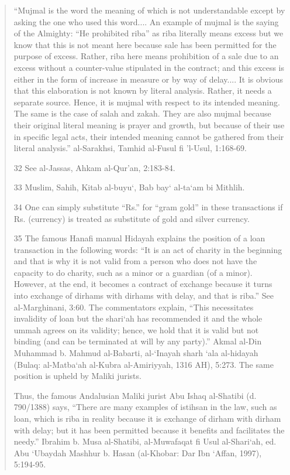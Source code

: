\begin{quote}
“Mujmal is the word the meaning of which is not understandable except by asking the one who used this word.... An example of mujmal is the saying of the Almighty: “He prohibited riba” as riba literally means excess but we know that this is not meant here because sale has been permitted for the purpose of excess. Rather, riba here means prohibition of a sale due to an excess without a counter-value stipulated in the contract; and this excess is either in the form of increase in measure or by way of delay.... It is obvious that this elaboration is not known by literal analysis. Rather, it needs a separate source. Hence, it is mujmal with respect to its intended meaning. The same is the case of salah and zakah. They are also mujmal because their original literal meaning is prayer and growth, but because of their use in specific legal acts, their intended meaning cannot be gathered from their literal analysis.” al-Sarakhsi, Tamhid al-Fusul fi 'l-Usul, 1:168-69.

32 See al-Jassas, Ahkam al-Qur'an, 2:183-84.

33 Muslim, Sahih, Kitab al-buyu‘, Bab bay‘ al-ta‘am bi Mithlih.

34 One can simply substitute “Rs.” for “gram gold” in these transactions if Rs. (currency) is treated as substitute of gold and silver currency.

35 The famous Hanafi manual Hidayah explains the position of a loan transaction in the following words: “It is an act of charity in the beginning and that is why it is not valid from a person who does not have the capacity to do charity, such as a minor or a guardian (of a minor). However, at the end, it becomes a contract of exchange because it turns into exchange of dirhams with dirhams with delay, and that is riba.” See al-Marghinani, 3:60. The commentators explain, “This necessitates invalidity of loan but the shari‘ah has recommended it and the whole ummah agrees on its validity; hence, we hold that it is valid but not binding (and can be terminated at will by any party).” Akmal al-Din Muhammad b. Mahmud al-Babarti, al-‘Inayah sharh ‘ala al-hidayah (Bulaq: al-Matba‘ah al-Kubra al-Amiriyyah, 1316 AH), 5:273. The same position is upheld by Maliki jurists.

Thus, the famous Andalusian Maliki jurist Abu Ishaq al-Shatibi (d. 790/1388) says, “There are many examples of istihsan in the law, such as loan, which is riba in reality because it is exchange of dirham with dirham with delay; but it has been permitted because it benefits and facilitates the needy.” Ibrahim b. Musa al-Shatibi, al-Muwafaqat fi Usul al-Shari‘ah, ed. Abu ‘Ubaydah Mashhur b. Hasan (al-Khobar: Dar Ibn ‘Affan, 1997), 5:194-95.


\end{quote}
